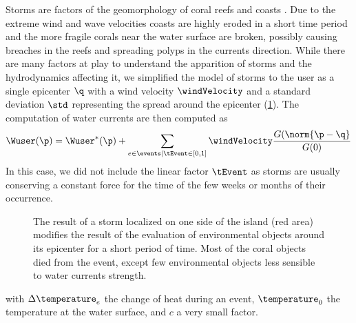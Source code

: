 Storms are factors of the geomorphology of coral reefs \cite{VilaConcejo2016, Oron2023} and coasts \cite{Dominguez2005, Cowart2010}. Due to the extreme wind and wave velocities coasts are highly eroded in a short time period and the more fragile corals near the water surface are broken, possibly causing breaches in the reefs and spreading polyps in the currents direction. While there are many factors at play to understand the apparition of storms and the hydrodynamics affecting it, we simplified the model of storms to the user as a single epicenter $\q$ with a wind velocity $\windVelocity$ and a standard deviation $\std$ representing the spread around the epicenter (\cref{fig:env-obj-storm-event}). The computation of water currents are then computed as 
\begin{align*}
    \Wuser(\p) = \Wuser^*(\p) + \sum_{e \in \events | \tEvent \in [0, 1]} {\windVelocity \frac{G(\norm{\p - \q}}{G(0)}}
\end{align*}
In this case, we did not include the linear factor $\tEvent$ as storms are usually conserving a constant force for the time of the few weeks or months of their occurrence. 

\begin{figure}
    \caption{The result of a storm localized on one side of the island (red area) modifies the result of the evaluation of environmental objects around its epicenter for a short period of time. Most of the coral objects died from the event, except few environmental objects less sensible to water currents strength. }
    \label{fig:env-obj-storm-event}
\end{figure}

with $\Delta \temperature_e$ the change of heat during an event, $\temperature_0$ the temperature at the water surface, and $c$ a very small factor.

